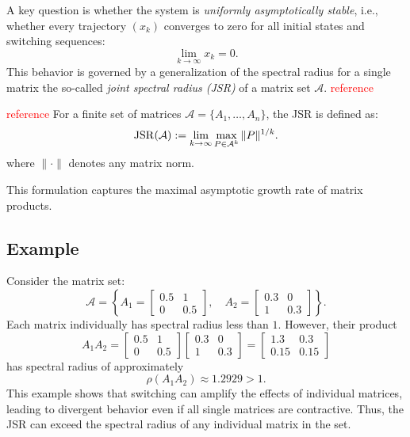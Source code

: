 A key question is whether the system is \emph{uniformly asymptotically stable}, i.e., whether every trajectory $(x_k)$ converges to zero for all initial states and switching sequences:
\[
\lim_{k \to \infty} x_k = 0.
\]
This behavior is governed by a generalization of the spectral radius for a single matrix the so-called \emph{joint spectral radius (JSR)} of a matrix set $\mathcal{A}$. \textcolor{red}{reference}
\begin{definition}
    \label{def:JSR}
    \textcolor{red}{reference}
    For a finite set of matrices $\mathcal{A} = \{A_1, \dots, A_n\}$, the JSR is defined as:
    \begin{equation} \label{eq:jsr_def}
        \operatorname{JSR}(\mathcal{A}) := \lim_{k \to \infty} \max_{P \in \mathcal{A}^k}  \|P\|^{1/k}.
    \end{equation}
    where $\|\cdot\|$ denotes any matrix norm.
\end{definition}
This formulation captures the maximal asymptotic growth rate of matrix products.

\subsection*{Example}

Consider the matrix set:
\[
\mathcal{A} = \left\{ A_1 = 
\begin{bmatrix}
0.5 & 1 \\
0 & 0.5
\end{bmatrix}, \quad
A_2 =
\begin{bmatrix}
0.3 & 0 \\
1 & 0.3
\end{bmatrix}
\right\}.
\]
Each matrix individually has spectral radius less than $1$. However, their product
\[
A_1 A_2 =
\begin{bmatrix}
0.5 & 1 \\
0 & 0.5
\end{bmatrix}
\begin{bmatrix}
0.3 & 0 \\
1 & 0.3
\end{bmatrix}
=
\begin{bmatrix}
1.3 & 0.3 \\
0.15 & 0.15
\end{bmatrix}
\]
has spectral radius of approximately
\[
\rho(A_1 A_2) \approx 1.2929 > 1.
\]
This example shows that switching can amplify the effects of individual matrices, leading to divergent behavior even if all single matrices are contractive. Thus, the JSR can exceed the spectral radius of any individual matrix in the set.

